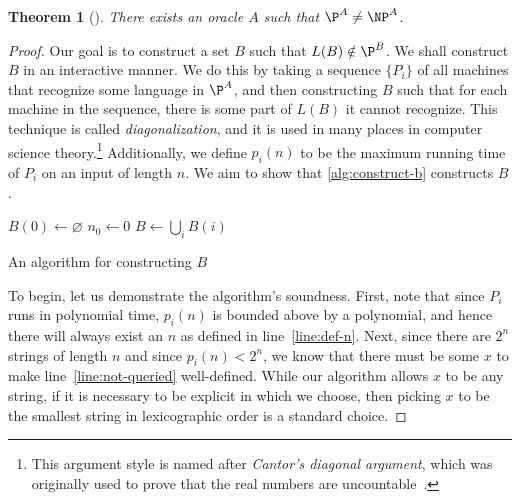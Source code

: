 \documentclass[english,12pt]{reedthesis}
\theoremstyle{plain}
\newtheorem{thm}{Theorem}[section]
\theoremstyle{definition}
\theoremstyle{remark}
\begin{document}
\begin{thm}[{\cite[Theorem 3]{BGS75}}]\label{thm:p-np-nrel}
  There exists an oracle $A$ such that $\P^{A} \ne \NP^{A}$.
\end{thm}

\begin{proof}
  Our goal is to construct a set $B$ such that $L(B) \notin \P^{B}$. We shall
  construct $B$ in an interactive manner. We do this by taking a sequence
  $\{P_{i}\}$ of all machines that recognize some language in $\P^{A}$, and then
  constructing $B$ such that for each machine in the sequence, there is some
  part of $L(B)$ it cannot recognize. This technique is called
  \emph{diagonalization}, and it is used in many places
  in computer science theory.\footnote{This argument style is named after
    \emph{Cantor's diagonal argument}, which was originally used to prove that
    the real numbers are uncountable~\cite[Thm. 2.14]{Ru76}.} Additionally, we
  define $p_{i}(n)$ to be the maximum running time of $P_{i}$ on an input of
  length $n$. We aim to show that \cref{alg:construct-b} constructs $B$.

  \begin{algorithm}[htbp]
    $B(0) \leftarrow \varnothing$\;
    $n_{0} \leftarrow 0$\;
    $B \leftarrow \bigcup_{i}B(i)$\;
    \caption{An algorithm for constructing $B$}\label{alg:construct-b}
  \end{algorithm}

  To begin, let us demonstrate the algorithm's soundness. First, note that since
  $P_{i}$ runs in polynomial time, $p_{i}(n)$ is bounded above by a polynomial,
  and hence there will always exist an $n$ as defined in line~\ref{line:def-n}.
  Next, since there are $2^{n}$ strings of length $n$ and since
  $p_{i}(n) < 2^{n}$, we know that there must be some $x$ to make
  line~\ref{line:not-queried} well-defined. While our algorithm allows $x$ to be
  any string, if it is necessary to be explicit in which we choose, then picking
  $x$ to be the smallest string in lexicographic order is a standard choice.


\end{proof}
\end{document}
